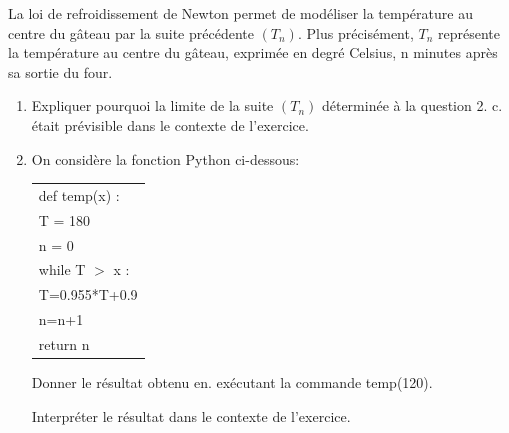 \documentclass[10pt]{article}
\begin{document}
\begin{enumerate}
La loi de refroidissement de Newton permet de modéliser la température au centre du gâteau par la suite précédente $\left(T_n\right)$. Plus précisément, $T_n$ représente la température au centre du gâteau, exprimée en degré Celsius, n minutes après sa sortie du four.
	\begin{enumerate}
		\item Expliquer pourquoi la limite de la suite $\left(T_n\right)$ déterminée à la question 2. c. était prévisible dans le contexte de l'exercice.
		\item On considère la fonction Python ci-dessous:
		\begin{center}
		\begin{tabular}{|l|}\hline
def temp(x) :\\
\quad T = 180\\
\quad n = 0\\
\quad while T $>$ x :\\
\qquad T=0.955*T+0.9\\
\qquad n=n+1\\
\quad return n\\ \hline
\end{tabular}
\end{center}
Donner le résultat obtenu en. exécutant la commande temp(120).

Interpréter le résultat dans le contexte de l'exercice.
	\end{enumerate}
\end{enumerate}

\bigskip
\end{document}
